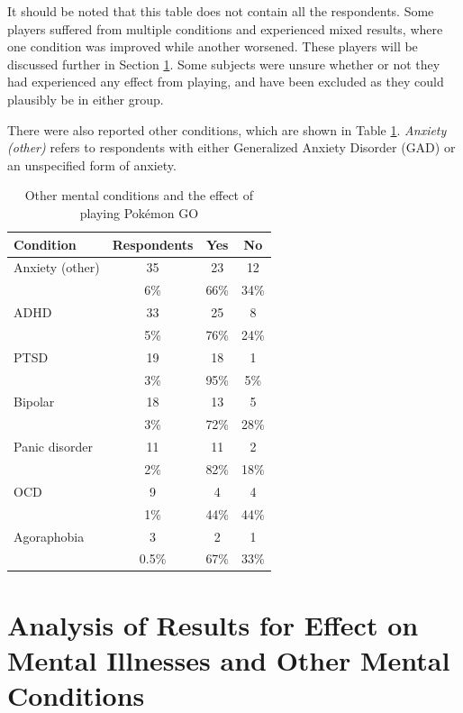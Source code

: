 It should be noted that this table does not contain all the respondents. Some players suffered from multiple conditions and experienced mixed results, where one condition was improved while another worsened. These players will be discussed further in Section \ref{sec:mental-conditions-analysis}. Some subjects were unsure whether or not they had experienced any effect from playing, and have been excluded as they could plausibly be in either group.

There were also reported other conditions, which are shown in Table \ref{tbl:other-mental-conditions-effect}. \emph{Anxiety (other)} refers to respondents with either Generalized Anxiety Disorder (GAD) or an unspecified form of anxiety.

\begin{table}[h]
	\centering
	\caption{Other mental conditions and the effect of playing Pokémon GO}
	\label{tbl:other-mental-conditions-effect}
	\begin{tabular}{|l|c|c|c|}
		\hline
		\textbf{Condition} & \textbf{Respondents} & \textbf{Yes} & \textbf{No}\\
		\hline\hline
		Anxiety (other)	& 35	& 23	& 12\\
						& 6\%	& 66\%	& 34\%\\\hline
		ADHD			& 33	& 25	& 8\\
						& 5\%	& 76\%	& 24\%\\\hline
		PTSD			& 19	& 18	& 1\\
						& 3\%	& 95\%	& 5\%\\\hline
		Bipolar			& 18	& 13	& 5\\
						& 3\%	& 72\%	& 28\%\\\hline
		Panic disorder	& 11	& 11	& 2\\
						& 2\%	& 82\%	& 18\%\\\hline
		OCD				& 9		& 4		& 4\\
						& 1\%	& 44\%	& 44\%\\\hline
		Agoraphobia		& 3		& 2		& 1\\
						& 0.5\%	& 67\%	& 33\%\\\hline
	\end{tabular}
\end{table}

\section{Analysis of Results for Effect on Mental Illnesses and Other Mental Conditions}
\label{sec:mental-conditions-analysis}

